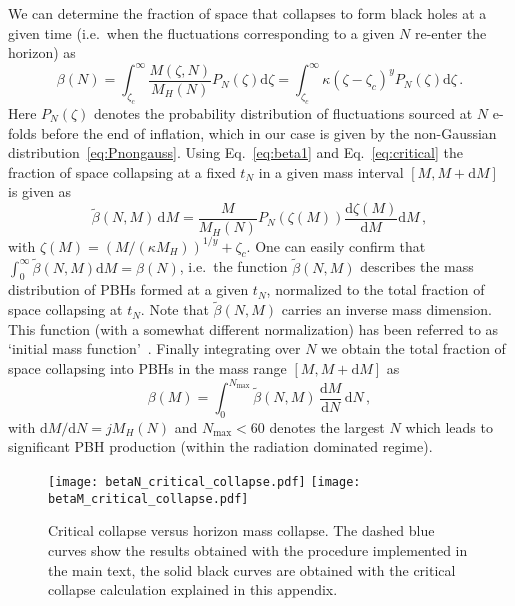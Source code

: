 We can determine the fraction of space that collapses to form black holes at a given time (i.e.\ when the fluctuations corresponding to a given $N$ re-enter the horizon) as
\begin{equation}
\beta(N) = \int_{\zeta_c}^\infty  \frac{M(\zeta, N)}{M_H(N)} P_N(\zeta) \textrm{d}\zeta =  \int_{\zeta_c}^\infty  \kappa (\zeta - \zeta_c)^y P_N(\zeta) \textrm{d}\zeta\,.
\label{eq:beta1}
\end{equation}
Here $P_N(\zeta)$ denotes the probability distribution of fluctuations sourced at $N$ e-folds before the end of inflation, which in our case is given by the non-Gaussian distribution~\eqref{eq:Pnongauss}. Using Eq.~\eqref{eq:beta1} and Eq.~\eqref{eq:critical} the fraction of space collapsing at a fixed $t_N$ in a given mass interval $[M, M + \textrm{d}M]$ is given as
\begin{equation}
\tilde \beta(N,M) \, \textrm{d}M = \frac{M}{M_H(N)} P_N(\zeta(M)) \frac{\textrm{d} \zeta(M)}{\textrm{d} M} \textrm{d}M \,,
\end{equation}
with $\zeta(M) = (M/(\kappa M_H))^{1/y} + \zeta_c$. One can easily confirm that $\int_0^\infty \tilde \beta(N,M) \textrm{d}M = \beta(N)$, i.e.\ the function $\tilde \beta(N,M)$ describes the mass distribution of PBHs formed at a given $t_N$, normalized to the total fraction of space collapsing at $t_N$. Note that $\tilde \beta(N,M)$ carries an inverse mass dimension. This function (with a somewhat different normalization) has been referred to as `initial mass function'~\cite{Niemeyer:1997mt,Carr:2016drx}. Finally integrating over $N$ we obtain the total fraction of space collapsing into PBHs in the mass range $[M, M + \textrm{d}M]$ as
\begin{equation}
\beta(M) = \int_0^{N_\text{max}} \tilde \beta(N,M) \, \frac{\textrm{d}M}{\textrm{d}N} \, \textrm{d}N \,,
\label{eq:betaMc1}
\end{equation}
with $\textrm{d}M/\textrm{d}N = j M_H(N)$ and $N_\text{max} < 60$ denotes the largest $N$ which leads to significant PBH production (within the radiation dominated regime). 


%
\begin{figure}
\centering
\texttt{[image: betaN\_critical\_collapse.pdf]}\hfill
\texttt{[image: betaM\_critical\_collapse.pdf]}
%
\caption{Critical collapse versus horizon mass collapse. The dashed blue curves show the results obtained with the procedure implemented in the main text, the solid black curves are obtained with the critical collapse calculation explained in this appendix.}
\label{fig:betas}
%
\end{figure}

